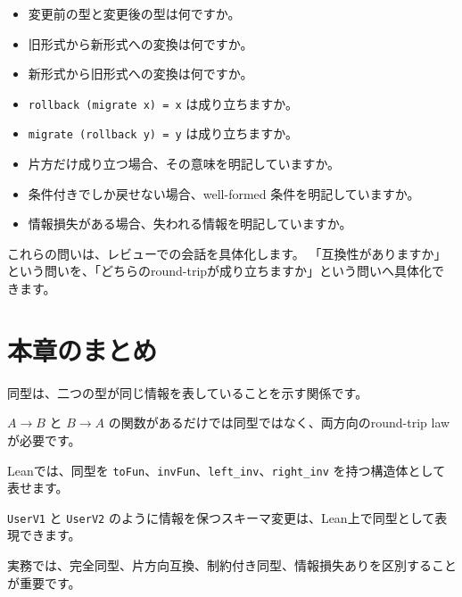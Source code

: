 \begin{itemize}
\item 変更前の型と変更後の型は何ですか。
\item 旧形式から新形式への変換は何ですか。
\item 新形式から旧形式への変換は何ですか。
\item \texttt{rollback (migrate x) = x} は成り立ちますか。
\item \texttt{migrate (rollback y) = y} は成り立ちますか。
\item 片方だけ成り立つ場合、その意味を明記していますか。
\item 条件付きでしか戻せない場合、well-formed 条件を明記していますか。
\item 情報損失がある場合、失われる情報を明記していますか。
\end{itemize}

これらの問いは、レビューでの会話を具体化します。
「互換性がありますか」という問いを、「どちらのround-tripが成り立ちますか」という問いへ具体化できます。

\section{本章のまとめ}
\label{sec:ch12-summary}

同型は、二つの型が同じ情報を表していることを示す関係です。

$A \to B$ と $B \to A$ の関数があるだけでは同型ではなく、両方向のround-trip lawが必要です。

Leanでは、同型を \texttt{toFun}、\texttt{invFun}、\texttt{left\_inv}、\texttt{right\_inv} を持つ構造体として表せます。

\texttt{UserV1} と \texttt{UserV2} のように情報を保つスキーマ変更は、Lean上で同型として表現できます。

実務では、完全同型、片方向互換、制約付き同型、情報損失ありを区別することが重要です。
